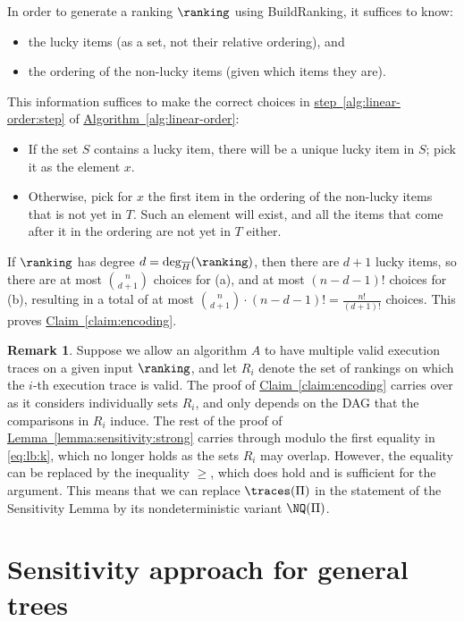 \documentclass[11pt]{article}
\numberwithin{equation}{section}
\theoremstyle{definition}
\newtheorem{remark}[theorem]{Remark}
\theoremstyle{plain}
\newcommand{\expref}[2]{\hyperref[#2]{#1~\ref{#2}}}
\begin{document}
In order to generate a ranking $\ranking$ using BuildRanking, it suffices to know:
\begin{itemize}
\item[(a)] the lucky items (as a set, not their relative ordering), and 
\item[(b)] the ordering of the non-lucky items (given which items they are).
\end{itemize}
This information suffices to make the correct choices in \expref{step}{alg:linear-order:step} of \expref{Algorithm}{alg:linear-order}:
\begin{itemize}
\item 
If the set $S$ contains a lucky item, there will be a unique lucky item in  $S$; pick it as the element $x$.
\item 
Otherwise, pick for $x$ the first item in the ordering of the non-lucky items that is not yet in $T$. Such an element will exist, and all the items that come after it in the ordering are not yet in $T$ either.
\end{itemize}
If $\ranking$ has degree $d = \deg_{\overline{H}}(\ranking)$, then there are $d+1$ lucky items, so there are at most $\binom{n}{d+1}$ choices for (a), and at most $(n-d-1)!$ choices for (b), resulting in a total of at most $\binom{n}{d+1} \cdot (n-d-1)! = \frac{n!}{(d+1)!}$ choices. This proves \expref{Claim}{claim:encoding}.

\begin{remark}\label{remark:sensitivity}
Suppose we allow an algorithm $A$ to have multiple valid execution traces on a given input $\ranking$, and let $R_i$ denote the set of rankings on which the $i$-th execution trace is valid. The proof of \expref{Claim}{claim:encoding} carries over as it considers individually sets $R_i$, and only depends on the DAG that the comparisons in $R_i$ induce. The rest of the proof of \expref{Lemma}{lemma:sensitivity:strong} carries through modulo the first equality in \eqref{eq:lb:k}, which no longer holds as the sets $R_i$ may overlap. However, the equality can be replaced by the inequality $\ge$, which does hold and is sufficient for the argument. This means that we can replace $\traces(\Pi)$ in the statement of the Sensitivity Lemma by its nondeterministic variant $\NQ(\Pi)$.
\end{remark}



\section{Sensitivity approach for general trees}
\label{sec:sensitivity:general}
\end{document}
